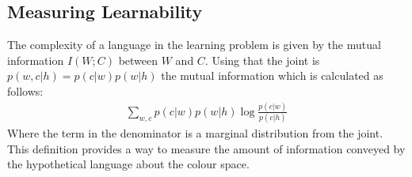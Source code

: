 \documentclass[11pt]{article}
\begin{document}
\subsection{Measuring Learnability}\label{sssec:learnability}

The complexity of a language in the learning problem is given by the mutual information $I(W;C)$ between $W$ and $C$. Using that the joint is $p(w,c|h)=p(c|w)p(w|h)$ the mutual information which is calculated as follows:
\begin{align}
\sum_{w,c} p(c|w)p(w|h)\log\frac{p(c|w)}{p(c|h)}
\end{align}
Where the term in the denominator is a marginal distribution from the joint. This definition provides a way to measure the amount of information conveyed by the hypothetical language about the colour space. 


\end{document}

